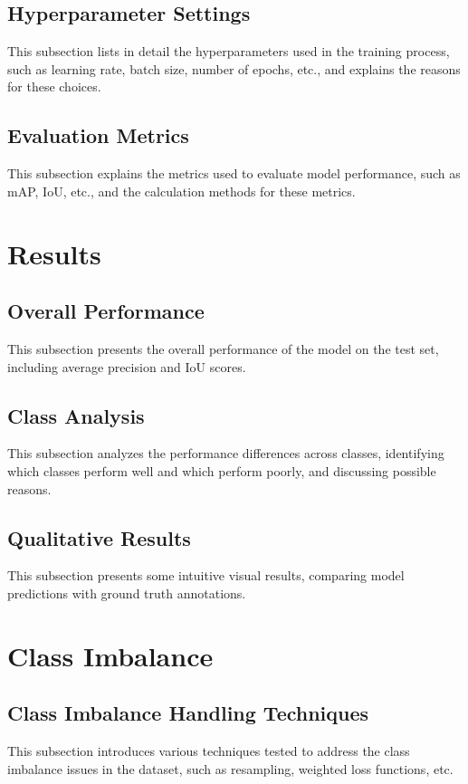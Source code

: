 \documentclass[conference]{IEEEtran}
\begin{document}
\subsection{Hyperparameter Settings}
This subsection lists in detail the hyperparameters used in the training process, such as learning rate, batch size, number of epochs, etc., and explains the reasons for these choices.

\subsection{Evaluation Metrics}
This subsection explains the metrics used to evaluate model performance, such as mAP, IoU, etc., and the calculation methods for these metrics.

\section{Results}
\subsection{Overall Performance}
This subsection presents the overall performance of the model on the test set, including average precision and IoU scores.

\subsection{Class Analysis}
This subsection analyzes the performance differences across classes, identifying which classes perform well and which perform poorly, and discussing possible reasons.

\subsection{Qualitative Results}
This subsection presents some intuitive visual results, comparing model predictions with ground truth annotations.

\section{Class Imbalance}
\subsection{Class Imbalance Handling Techniques}
This subsection introduces various techniques tested to address the class imbalance issues in the dataset, such as resampling, weighted loss functions, etc.
\end{document}
